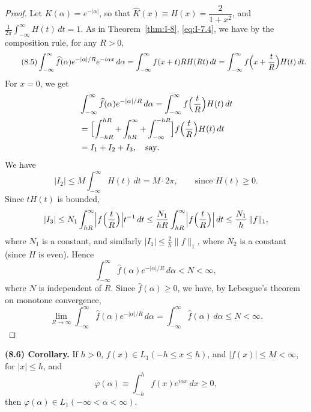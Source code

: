 \begin{proof}
Let $K(\alpha)=e^{-|\alpha|}$, so that $\hat K(x)\equiv H(x)=\dfrac{2}{1+x^{2}}$, and $\frac{1}{2\pi}\int_{-\infty}^{\infty}H(t)\,dt=1$. As in Theorem~\ref{thm:I-8}, \eqref{eq:I-7.4}, we have by the composition rule, for any $R>0$,
\begin{equation}\label{eq:I-8.5}\tag{8.5}
\int_{-\infty}^{\infty}\widehat f(\alpha)e^{-|\alpha|/R}e^{-i\alpha x}\,d\alpha
=\int_{-\infty}^{\infty}f(x+t)RH(Rt)\,dt
=\int_{-\infty}^{\infty}f\Bigl(x+\frac{t}{R}\Bigr)H(t)\,dt.
\end{equation}
For $x=0$, we get
\begin{equation*}
\begin{aligned}
&\int_{-\infty}^{\infty}\widehat f(\alpha)e^{-|\alpha|/R}\,d\alpha = \int_{-\infty}^{\infty}f\Bigl(\frac{t}{R}\Bigr)H(t)\,dt\\
&= \Bigl[\int_{-hR}^{hR}+\int_{hR}^{\infty}+\int_{-\infty}^{-hR}\Bigr]f\Bigl(\frac{t}{R}\Bigr)H(t)\,dt\\
&= I_1+I_2+I_3,\quad\text{say}.
\end{aligned}
\end{equation*}
We have
\begin{equation*}
|I_2|\le M\int_{-\infty}^{\infty}H(t)\,dt=M\cdot 2\pi,\qquad\text{since }H(t)\ge 0.
\end{equation*}
Since $tH(t)$ is bounded,
\begin{equation*}
|I_3|\le N_1\int_{hR}^{\infty}\Bigl|f\Bigl(\frac{t}{R}\Bigr)\Bigr|t^{-1}\,dt
\le\frac{N_1}{hR}\int_{hR}^{\infty}\Bigl|f\Bigl(\frac{t}{R}\Bigr)\Bigr|\,dt
\le\frac{N_1}{h}\,\|f\|_1,
\end{equation*}
where $N_1$ is a constant, and similarly $|I_1|\le\frac{2}{h}\|f\|_1$, where $N_2$ is a constant (since $H$ is even). Hence
\begin{equation*}
\int_{-\infty}^{\infty}\widehat f(\alpha)e^{-|\alpha|/R}\,d\alpha<N<\infty,
\end{equation*}
where $N$ is independent of $R$. Since $\widehat f(\alpha)\ge 0$, we have, by Lebesgue's theorem on monotone convergence,
\begin{equation*}
\lim_{R\to\infty}\int_{-\infty}^{\infty}\widehat f(\alpha)e^{-|\alpha|/R}\,d\alpha
=\int_{-\infty}^{\infty}\widehat f(\alpha)\,d\alpha\le N<\infty.
\end{equation*}
\end{proof}

\noindent\textbf{(8.6) Corollary.}
If $h>0$, $f(x)\in L_1(-h\le x\le h)$, and $|f(x)|\le M<\infty$, for $|x|\le h$, and
\begin{equation*}
\varphi(\alpha)\equiv\int_{-h}^{h}f(x)e^{i\alpha x}\,dx\ge 0,
\end{equation*}
then $\varphi(\alpha)\in L_1(-\infty<\alpha<\infty)$.

